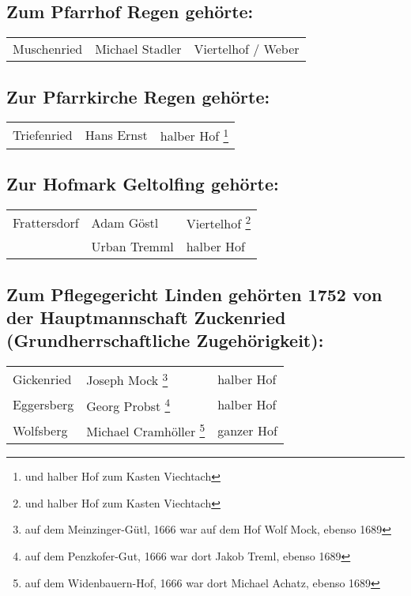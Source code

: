 \documentclass[12pt,a4pager,draft]{book}
\begin{document}
\subsection{Zum Pfarrhof Regen gehörte:}

\begin{longtable}{l|l|l}
Muschenried & Michael Stadler & Viertelhof / Weber\\
\end{longtable}

\subsection{Zur Pfarrkirche Regen gehörte:}

\begin{longtable}{l|l|l}
Triefenried & Hans Ernst & halber Hof \footnote{und halber Hof zum Kasten
Viechtach}\\
\end{longtable}

\subsection{Zur Hofmark Geltolfing gehörte:}

\begin{longtable}{l|l|l}
Frattersdorf & Adam Göstl & Viertelhof \footnote{und halber Hof zum Kasten
Viechtach}\\

& Urban Tremml & halber Hof\\
\end{longtable}

\subsection{Zum Pflegegericht Linden gehörten 1752
\protect\footnotemark{}\protect{} von der Hauptmannschaft Zuckenried
(Grundherrschaftliche Zugehörigkeit):}

\begin{longtable}{l|l|l}
Gickenried & Joseph Mock \footnote{auf dem Meinzinger-Gütl, 1666 war auf dem Hof
Wolf Mock, ebenso 1689} & halber Hof\\

Eggersberg & Georg Probst \footnote{auf dem Penzkofer-Gut, 1666 war dort Jakob
Treml, ebenso 1689} & halber Hof\\

Wolfsberg & Michael Cramhöller \footnote{auf dem Widenbauern-Hof, 1666 war dort
Michael Achatz, ebenso 1689} & ganzer Hof\\
\end{longtable}
\end{document}
